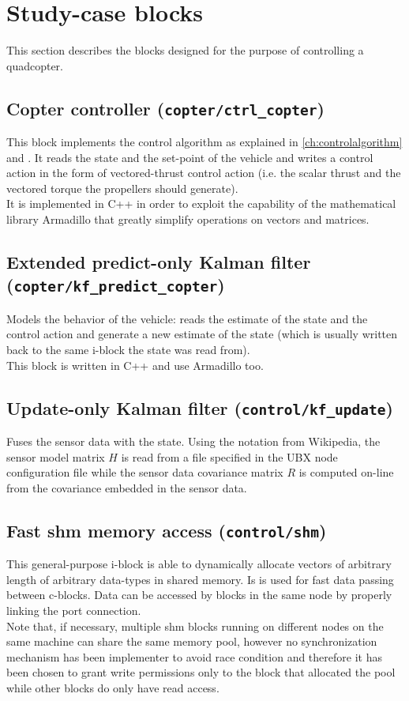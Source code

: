 \section{Study-case blocks}
This section describes the blocks designed for the purpose of controlling a quadcopter.

\subsection{Copter controller (\texttt{copter/ctrl\_copter})}
This block implements the control algorithm as explained in \autoref{ch:controlalgorithm} and \autocite{marconi}. It reads the state and the set-point of the vehicle and writes a control action in the form of vectored-thrust control action (i.e. the scalar thrust and the vectored torque the propellers should generate).\\
It is implemented in C++ in order to exploit the capability of the mathematical library Armadillo that greatly simplify operations on vectors and matrices. 

\subsection{Extended predict-only Kalman filter (\texttt{copter/kf\_predict\_copter})}
Models the behavior of the vehicle: reads the estimate of the state and the control action and generate a new estimate of the state (which is usually written back to the same i-block the state was read from).\\
This block is written in C++ and use Armadillo too.

\subsection{Update-only Kalman filter (\texttt{control/kf\_update})}
Fuses the sensor data with the state. Using the notation from Wikipedia\autocite{bib:wiki:kalmann}, the sensor model matrix $ H $ is read from a file specified in the UBX node configuration file while the sensor data covariance matrix $ R $ is computed on-line from the covariance embedded in the sensor data.

\subsection{Fast shm memory access (\texttt{control/shm})}
This general-purpose i-block is able to dynamically allocate vectors of arbitrary length of arbitrary data-types in shared memory. Is is used for fast data passing between c-blocks. Data can be accessed by blocks in the same node by properly linking the port connection.\\
Note that, if necessary, multiple shm blocks running on different nodes on the same machine can share the same memory pool, however no synchronization mechanism has been implementer to avoid race condition and therefore it has been chosen to grant write permissions only to the block that allocated the pool while other blocks do only have read access.

